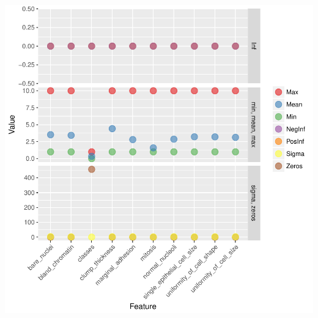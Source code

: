 \documentclass[]{article}
\begin{document}
\begin{center}\includegraphics{webinar_code_files/figure-latex/h2o_describe-1} \end{center}
\end{document}
